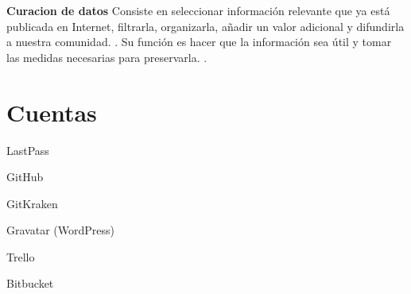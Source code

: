 \documentclass[12pt,letterpaper]{article}
\begin{document}
\item\textbf{Curacion de datos}
Consiste en seleccionar informaci\'on relevante que ya est\'a publicada en Internet, filtrarla, organizarla, añadir un valor adicional y difundirla a nuestra comunidad.
\cite[(Duro, S. 2017)]{ref14}.
Su funci\'on es hacer que la informaci\'on sea \'util y tomar las medidas necesarias para preservarla.
\cite[(It User. 2020)]{ref15}.

\section{Cuentas}
\item LastPass
\item GitHub
\item GitKraken
\item Gravatar (WordPress)
\item Trello
\item Bitbucket


\item
\item
\item
\end{document}
